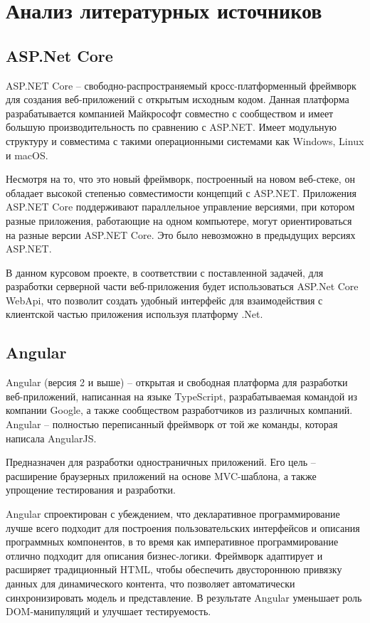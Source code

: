 \section{Анализ литературных источников}
\label{sec:literature_analysis}

\subsection{ASP.Net Core}

ASP.NET Core -- свободно-распространяемый кросс-платформенный фреймворк для создания веб-приложений с открытым исходным кодом. Данная платформа разрабатывается компанией Майкрософт совместно с сообществом и имеет большую производительность по сравнению с ASP.NET. Имеет модульную структуру и совместима с такими операционными системами как Windows, Linux и macOS.

Несмотря на то, что это новый фреймворк, построенный на новом веб-стеке, он обладает высокой степенью совместимости концепций с ASP.NET. Приложения ASP.NET Core поддерживают параллельное управление версиями, при котором разные приложения, работающие на одном компьютере, могут ориентироваться на разные версии ASP.NET Core. Это было невозможно в предыдущих версиях ASP.NET.

В данном курсовом проекте, в соответствии с поставленной задачей, для разработки серверной части веб-приложения будет использоваться ASP.Net Core WebApi, что позволит создать удобный интерфейс для взаимодействия с клиентской частью приложения используя платформу .Net.

\subsection{Angular}
Angular (версия 2 и выше) -- открытая и свободная платформа для разработки веб-приложений, написанная на языке TypeScript, разрабатываемая командой из компании Google, а также сообществом разработчиков из различных компаний. Angular -- полностью переписанный фреймворк от той же команды, которая написала AngularJS.

Предназначен для разработки одностраничных приложений. Его цель -- расширение браузерных приложений на основе MVC-шаблона, а также упрощение тестирования и разработки.

Angular спроектирован с убеждением, что декларативное программирование лучше всего подходит для построения пользовательских интерфейсов и описания программных компонентов, в то время как императивное программирование отлично подходит для описания бизнес-логики. Фреймворк адаптирует и расширяет традиционный HTML, чтобы обеспечить двустороннюю привязку данных для динамического контента, что позволяет автоматически синхронизировать модель и представление. В результате Angular уменьшает роль DOM-манипуляций и улучшает тестируемость.

